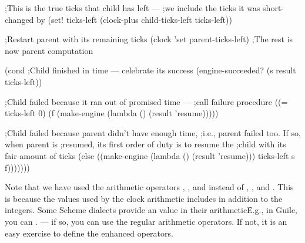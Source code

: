 {        ;This is the true ticks that child has left —
        ;we include the ticks it was short-changed by
        (set! ticks-left
          (clock-plus child-ticks-left ticks-left))

        ;Restart parent with its remaining ticks
        (clock 'set parent-ticks-left)
        ;The rest is now parent computation

        (cond
         ;Child finished in time — celebrate its success
         (engine-succeeded? (s result ticks-left))

         ;Child failed because it ran out of promised time —
         ;call failure procedure
         ((= ticks-left 0)
          (f (make-engine (lambda () (result 'resume)))))

         ;Child failed because parent didn’t have enough time,
         ;i.e., parent failed too.  If so, when parent is
         ;resumed, its first order of duty is to resume the
         ;child with its fair amount of ticks
         (else
          ((make-engine (lambda () (result 'resume)))
           ticks-left s f)))))))
}

Note that we have used the arithmetic operators
, , and 
instead of , \q{-}, and \q{+}.  This is because
the values used by the clock arithmetic includes
 in addition to the integers.  Some Scheme
dialects provide an  value in their
arithmetic\f{E.g., in Guile, you can .} — if so, you can use the regular
arithmetic operators.  If not, it is an easy exercise
to define the enhanced operators.

